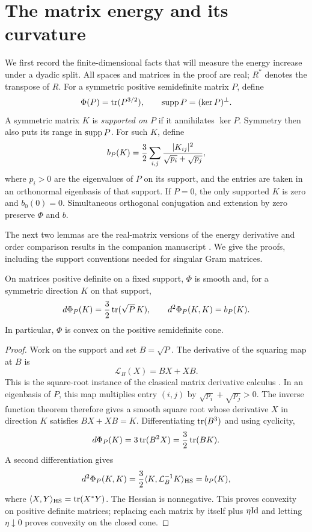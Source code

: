 \section{The matrix energy and its curvature}\label{sec:matrix}

We first record the finite-dimensional facts that will measure the
energy increase under a dyadic split. All spaces and matrices in the
proof are real; \(R^*\) denotes the transpose of \(R\).
For a symmetric positive semidefinite matrix \(P\), define
\[
 \Phi(P)=\operatorname{tr}(P^{3/2}),\qquad \operatorname{supp} P=(\ker P)^\perp.
\]
A symmetric matrix \(K\) is \emph{supported on \(P\)} if it annihilates
\(\ker P\). Symmetry then also puts its range in \(\operatorname{supp} P\).
For such \(K\), define
\begin{equation}\label{eq:hessian}
 b_P(K)=\frac32\sum_{i,j}
          \frac{\lvert K_{ij}\rvert^2}{\sqrt{p_i}+\sqrt{p_j}},
\end{equation}
where \(p_i>0\) are the eigenvalues of \(P\) on its support, and the
entries are taken in an orthonormal eigenbasis of that support.
If \(P=0\), the only supported \(K\) is zero and \(b_0(0)=0\).
Simultaneous orthogonal conjugation and extension by zero preserve
\(\Phi\) and \(b\).

The next two lemmas are the real-matrix versions of the energy
derivative and order comparison results in the companion manuscript
\cite[Section~2]{OpenAI2026}. We give the proofs, including the support
conventions needed for singular Gram matrices.

\begin{lemma}\label{lem:hessian}
On matrices positive definite on a fixed support, \(\Phi\) is smooth
and, for a symmetric direction \(K\) on that support,
\[
 d\Phi_P(K)=\frac32\operatorname{tr}(\sqrt P\,K),
 \qquad d^2\Phi_P(K,K)=b_P(K).
\]
In particular, \(\Phi\) is convex on the positive semidefinite cone.
\end{lemma}

\begin{proof}
Work on the support and set \(B=\sqrt P\). The derivative of the
squaring map at \(B\) is
\[
 \mathcal L_B(X)=BX+XB.
\]
This is the square-root instance of the classical matrix derivative
calculus \cite[Section~1, Equation~(1)]{Daletskii1957}.
In an eigenbasis of \(P\), this map multiplies entry \((i,j)\) by
\(\sqrt{p_i}+\sqrt{p_j}>0\). The inverse function theorem therefore
gives a smooth square root whose derivative \(X\) in direction \(K\)
satisfies \(BX+XB=K\). Differentiating \(\operatorname{tr}(B^3)\) and using cyclicity,
\[
 d\Phi_P(K)=3\operatorname{tr}(B^2X)=\frac32\operatorname{tr}(BK).
\]
A second differentiation gives
\[
 d^2\Phi_P(K,K)
 =\frac32\langle K,\mathcal L_B^{-1}K\rangle_{\mathrm{HS}}
 =b_P(K),
\]
where \(\langle X,Y\rangle_{\mathrm{HS}}=\operatorname{tr}(X^*Y)\).
The Hessian is nonnegative. This proves convexity on positive
definite matrices; replacing each matrix by itself plus \(\eta\mathrm{Id}\)
and letting \(\eta\downarrow0\) proves convexity on the closed cone.
\end{proof}

